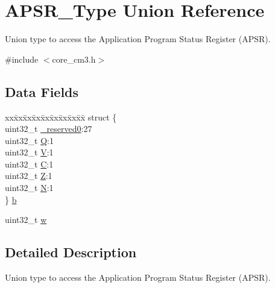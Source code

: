 \hypertarget{unionAPSR__Type}{\section{A\-P\-S\-R\-\_\-\-Type Union Reference}
\label{unionAPSR__Type}
}


Union type to access the Application Program Status Register (A\-P\-S\-R).  




{\ttfamily \#include $<$core\-\_\-cm3.\-h$>$}

\subsection*{Data Fields}
\begin{DoxyCompactItemize}
\item 
\begin{tabbing}
xx\=xx\=xx\=xx\=xx\=xx\=xx\=xx\=xx\=\kill
struct \{\\
\>uint32\_t \hyperlink{unionAPSR__Type_afbce95646fd514c10aa85ec0a33db728}{\_reserved0}:27\\
\>uint32\_t \hyperlink{unionAPSR__Type_a22d10913489d24ab08bd83457daa88de}{Q}:1\\
\>uint32\_t \hyperlink{unionAPSR__Type_a8004d224aacb78ca37774c35f9156e7e}{V}:1\\
\>uint32\_t \hyperlink{unionAPSR__Type_a86e2c5b891ecef1ab55b1edac0da79a6}{C}:1\\
\>uint32\_t \hyperlink{unionAPSR__Type_a3b04d58738b66a28ff13f23d8b0ba7e5}{Z}:1\\
\>uint32\_t \hyperlink{unionAPSR__Type_a7e7bbba9b00b0bb3283dc07f1abe37e0}{N}:1\\
\} \hyperlink{unionAPSR__Type_a57fde0b8cbbaaba67bf0fbac8a235126}{b}\\

\end{tabbing}\item 
uint32\-\_\-t \hyperlink{unionAPSR__Type_ae4c2ef8c9430d7b7bef5cbfbbaed3a94}{w}
\end{DoxyCompactItemize}


\subsection{Detailed Description}
Union type to access the Application Program Status Register (A\-P\-S\-R). 

